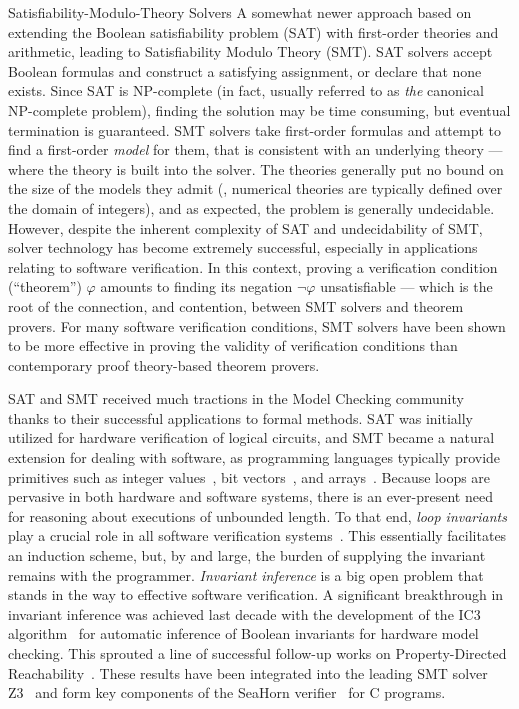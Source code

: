 \begin{paragraph}{Satisfiability-Modulo-Theory Solvers}
A somewhat newer approach based on extending the
Boolean satisfiability problem (SAT) with first-order theories and arithmetic, leading to
Satisfiability Modulo Theory (SMT).
SAT solvers accept Boolean formulas and construct a satisfying assignment, or
declare that none exists.
Since SAT is NP-complete (in fact, usually referred to as \emph{the} canonical
NP-complete problem), finding the solution may be time consuming, but eventual
termination is guaranteed.
SMT solvers take first-order formulas and attempt to find a first-order
\emph{model} for them, that is consistent with an underlying theory --- where the
theory is built into the solver.
The theories generally put no bound on the size of the models they admit
(\eg, numerical theories are typically defined over the domain of integers),
and as expected, the problem is generally undecidable.
However, despite the inherent complexity of SAT and undecidability of SMT,
solver technology has become extremely successful, especially in applications
relating to software verification.
In this context, proving a verification condition (``theorem'') $\varphi$
amounts to finding its negation $\lnot\varphi$ unsatisfiable --- which is the root
of the connection, and contention, between SMT solvers and theorem provers.
For many software verification conditions, SMT solvers have been shown to be
more effective in proving the validity of verification conditions than
contemporary proof theory-based theorem provers.

SAT and SMT received much tractions in the Model Checking community~\cite{clarke-grumberg} thanks to their successful applications to formal methods.
SAT was initially utilized for hardware verification of logical circuits, and SMT became a natural extension for dealing with software, as programming languages typically provide primitives such as integer values~\cite{CAV2006:Dutertre}, bit vectors~\cite{TACAS2007:Bryant}, and arrays~\cite{CAV2007:Ganesh}.
Because loops are pervasive in both hardware and software systems, there is an ever-present need for reasoning about executions of unbounded length.
To that end, \emph{loop invariants} play a crucial role in all software verification systems~\cite{dafny,fstar,leon}.
This essentially facilitates an induction scheme, but, by and large, the burden of supplying the invariant remains with the programmer.
\emph{Invariant inference} is a big open problem that stands in the way to effective software verification.
A significant breakthrough in invariant inference was achieved last decade with the development of the IC3 algorithm~\cite{bradley11} for automatic inference of Boolean invariants for hardware model checking.
This sprouted a line of successful follow-up works on Property-Directed Reachability~\cite{gurfinkel,shoham,vizel}.
These results have been integrated into the leading SMT solver Z3~\cite{z3,spacer} and form key components of the SeaHorn verifier~\cite{seahorn} for C programs.
\end{paragraph}


